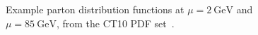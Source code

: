 \begin{figure}[htbp]
	\centering
	\hfill
	\hfill
	\hfill
	\caption{Example parton distribution functions at $\mu=\SI{2}{\giga\electronvolt}$ and $\mu=\SI{85}{\giga\electronvolt}$, from the CT10 PDF set~\cite{ct10}.}
	\label{fig:theory-pdf-example}
\end{figure}

